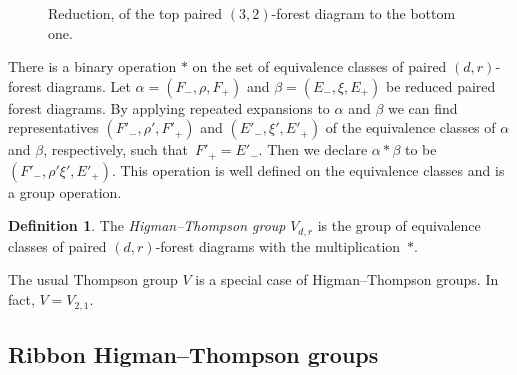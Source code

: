 \documentclass[11pt, a4paper]{amsart}
\theoremstyle{definition}
\newtheorem{defn}[thm]{Definition} %
\begin{document}
\begin{figure}[h]


\caption{Reduction, of the top paired $(3,2)$-forest diagram to the bottom one.}
\label{fig:reduction_V}
\end{figure}

There is a binary operation $\ast$ on the set of equivalence classes
of paired $(d,r)$-forest diagrams.  Let $\alpha =(F_-,\rho,F_+)$ and $\beta=(E_-,\xi,E_+)$
be reduced paired forest diagrams.  By applying repeated expansions to
$\alpha$ and $\beta$ we can find representatives $(F'_-,\rho',F'_+)$ and
$(E'_-,\xi',E'_+)$ of the equivalence classes of $\alpha$ and
$\beta$, respectively, such that~$F'_+ = E'_-$.  Then we
declare $ \alpha \ast  \beta $ to be $(F'_-,\rho'\xi',E'_+)$.  This operation is well defined on the equivalence classes and is a group operation.

\begin{defn}
    \label{def:Higman-V-F-T}
   The \emph{Higman--Thompson group} $V_{d,r}$ is the group of equivalence classes of paired
   $(d,r)$-forest diagrams with the multiplication~$\ast$.  
\end{defn}

The usual Thompson group $V$ is a special case of Higman--Thompson groups. In fact, $V= V_{2,1}$. 

\subsection{Ribbon Higman--Thompson groups}\label{subsect:braidedHTgroups} 
\end{document}
